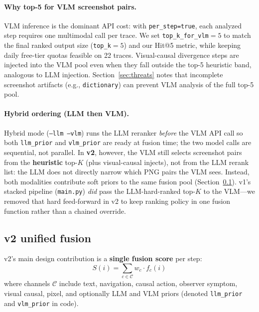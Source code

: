 \documentclass[sigconf,nonacm]{acmart}
\begin{document}
\paragraph{Why top-5 for VLM screenshot pairs.}
VLM inference is the dominant API cost: with \texttt{per\_step=true}, each analyzed step requires one multimodal call per trace.
We set \texttt{top\_k\_for\_vlm}${=}5$ to match the final ranked output size (\texttt{top\_k}${=}5$) and our Hit@5 metric, while keeping daily free-tier quotas feasible on 22 traces.
Visual-causal divergence steps are injected into the VLM pool even when they fall outside the top-5 heuristic band, analogous to LLM injection.
Section~\ref{sec:threats} notes that incomplete screenshot artifacts (e.g., \texttt{dictionary}) can prevent VLM analysis of the full top-5 pool.

\paragraph{Hybrid ordering (LLM then VLM).}
Hybrid mode (\texttt{--llm --vlm}) runs the LLM reranker \emph{before} the VLM API call so both \texttt{llm\_prior} and \texttt{vlm\_prior} are ready at fusion time; the two model calls are sequential, not parallel.
In \textbf{v2}, however, the VLM still selects screenshot pairs from the \textbf{heuristic} top-$K$ (plus visual-causal injects), not from the LLM rerank list: the LLM does not directly narrow which PNG pairs the VLM sees.
Instead, both modalities contribute soft priors to the same fusion pool (Section~\ref{sec:fusion}).
v1's stacked pipeline (\texttt{main.py}) \emph{did} pass the LLM-hard-ranked top-$K$ to the VLM---we removed that hard feed-forward in v2 to keep ranking policy in one fusion function rather than a chained override.

\subsection{v2 unified fusion}
\label{sec:fusion}

v2's main design contribution is a \textbf{single fusion score} per step:
\begin{equation}
  S(i) = \sum_{c \in \mathcal{C}} w_c \cdot f_c(i)
\end{equation}
where channels $\mathcal{C}$ include text, navigation, causal action, observer symptom, visual causal, pixel, and optionally LLM and VLM priors (denoted \texttt{llm\_prior} and \texttt{vlm\_prior} in code).
\end{document}

